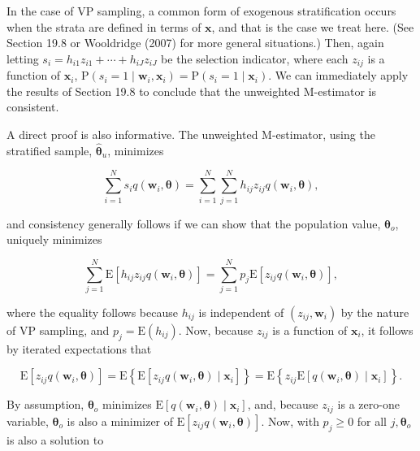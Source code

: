 \documentclass[10pt]{article}
\begin{document}
In the case of VP sampling, a common form of exogenous stratification occurs when the strata are defined in terms of $\mathbf{x}$, and that is the case we treat here. (See Section 19.8 or Wooldridge (2007) for more general situations.) Then, again letting $s_{i}=h_{i 1} z_{i 1}+\cdots+h_{i J} z_{i J}$ be the selection indicator, where each $z_{i j}$ is a function of $\mathbf{x}_{i}$, $\mathrm{P}\left(s_{i}=1 \mid \mathbf{w}_{i}, \mathbf{x}_{i}\right)=\mathrm{P}\left(s_{i}=1 \mid \mathbf{x}_{i}\right)$. We can immediately apply the results of Section 19.8 to conclude that the unweighted M-estimator is consistent.

A direct proof is also informative. The unweighted M-estimator, using the stratified sample, $\hat{\boldsymbol{\theta}}_{u}$, minimizes


\begin{equation*}
\sum_{i=1}^{N} s_{i} q\left(\mathbf{w}_{i}, \boldsymbol{\theta}\right)=\sum_{i=1}^{N} \sum_{j=1}^{N} h_{i j} z_{i j} q\left(\mathbf{w}_{i}, \boldsymbol{\theta}\right), \tag{20.16}
\end{equation*}


and consistency generally follows if we can show that the population value, $\boldsymbol{\theta}_{o}$, uniquely minimizes


\begin{equation*}
\sum_{j=1}^{N} \mathrm{E}\left[h_{i j} z_{i j} q\left(\mathbf{w}_{i}, \boldsymbol{\theta}\right)\right]=\sum_{j=1}^{N} p_{j} \mathrm{E}\left[z_{i j} q\left(\mathbf{w}_{i}, \boldsymbol{\theta}\right)\right], \tag{20.17}
\end{equation*}


where the equality follows because $h_{i j}$ is independent of $\left(z_{i j}, \mathbf{w}_{i}\right)$ by the nature of VP sampling, and $p_{j}=\mathrm{E}\left(h_{i j}\right)$. Now, because $z_{i j}$ is a function of $\mathbf{x}_{i}$, it follows by iterated expectations that


\begin{equation*}
\mathrm{E}\left[z_{i j} q\left(\mathbf{w}_{i}, \boldsymbol{\theta}\right)\right]=\mathrm{E}\left\{\mathrm{E}\left[z_{i j} q\left(\mathbf{w}_{i}, \boldsymbol{\theta}\right) \mid \mathbf{x}_{i}\right]\right\}=\mathrm{E}\left\{z_{i j} \mathrm{E}\left[q\left(\mathbf{w}_{i}, \boldsymbol{\theta}\right) \mid \mathbf{x}_{i}\right]\right\} . \tag{20.18}
\end{equation*}


By assumption, $\boldsymbol{\theta}_{o}$ minimizes $\mathrm{E}\left[q\left(\mathbf{w}_{i}, \boldsymbol{\theta}\right) \mid \mathbf{x}_{i}\right]$, and, because $z_{i j}$ is a zero-one variable, $\boldsymbol{\theta}_{o}$ is also a minimizer of $\mathrm{E}\left[z_{i j} q\left(\mathbf{w}_{i}, \boldsymbol{\theta}\right)\right]$. Now, with $p_{j} \geq 0$ for all $j, \boldsymbol{\theta}_{o}$ is also a solution to
\end{document}

